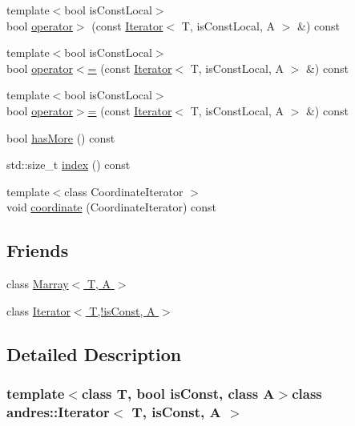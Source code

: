 \begin{DoxyCompactItemize}
\item 
{\footnotesize template$<$bool is\+Const\+Local$>$ }\\bool \hyperlink{classandres_1_1Iterator_a0ddb701b0ac1b721eee2348e016050fc}{operator$>$} (const \hyperlink{classandres_1_1Iterator}{Iterator}$<$ T, is\+Const\+Local, A $>$ \&) const 
\item 
{\footnotesize template$<$bool is\+Const\+Local$>$ }\\bool \hyperlink{classandres_1_1Iterator_a303fe7634819191eff8e2bb676083f9c}{operator$<$=} (const \hyperlink{classandres_1_1Iterator}{Iterator}$<$ T, is\+Const\+Local, A $>$ \&) const 
\item 
{\footnotesize template$<$bool is\+Const\+Local$>$ }\\bool \hyperlink{classandres_1_1Iterator_a8ab389dea14eeceb8bbee9a9d7d6a04a}{operator$>$=} (const \hyperlink{classandres_1_1Iterator}{Iterator}$<$ T, is\+Const\+Local, A $>$ \&) const 
\item 
bool \hyperlink{classandres_1_1Iterator_aa00e98e48b060ec6de7593d473643ef7}{has\+More} () const 
\item 
std\+::size\+\_\+t \hyperlink{classandres_1_1Iterator_a2f5bd43ca080a25450423d5f874b3cdd}{index} () const 
\item 
{\footnotesize template$<$class Coordinate\+Iterator $>$ }\\void \hyperlink{classandres_1_1Iterator_a6b0076e5b74f548e820cbfa6fb7681d7}{coordinate} (Coordinate\+Iterator) const 
\end{DoxyCompactItemize}
\subsection*{Friends}
\begin{DoxyCompactItemize}
\item 
class \hyperlink{classandres_1_1Iterator_ad7bf464de20a2e1bbc38644d8615fba8}{Marray$<$ T, A $>$}
\item 
class \hyperlink{classandres_1_1Iterator_a3a5905d3e8cc40712f6a818a92e94c3b}{Iterator$<$ T,!is\+Const, A $>$}
\end{DoxyCompactItemize}


\subsection{Detailed Description}
\subsubsection*{template$<$class T, bool is\+Const, class A$>$class andres\+::\+Iterator$<$ T, is\+Const, A $>$}

